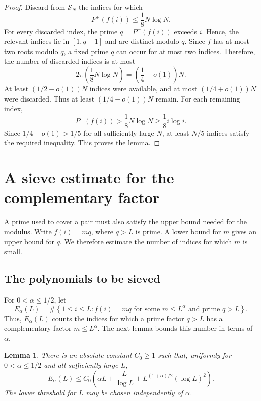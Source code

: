 \documentclass[11pt]{amsart}
\newtheorem{lemma}[theorem]{Lemma}
\theoremstyle{definition}
\theoremstyle{remark}
\begin{document}
\begin{proof}
Discard from $\mathcal S_N$ the indices for which
\[
P^+(f(i))\leq\frac18N\log N.
\]
For every discarded index, the prime $q=P^+(f(i))$ exceeds $i$.  Hence, the
relevant indices lie in $[1,q-1]$ and are distinct modulo $q$.  Since $f$
has at most two roots modulo $q$, a fixed prime $q$ can occur for at most two
indices.  Therefore,
the number of discarded indices is at most
\[
2\pi\left(\frac18N\log N\right)
=\left(\frac14+o(1)\right)N.
\]
At least $(1/2-o(1))N$ indices were available, and at most
$(1/4+o(1))N$ were discarded. Thus at least $(1/4-o(1))N$ remain. For
each remaining index,
\[
P^+(f(i))>\frac18N\log N\geq\frac18i\log i.
\]
Since $1/4-o(1)>1/5$ for all sufficiently large $N$, at least $N/5$ indices
satisfy the required inequality.  This proves the lemma.
\end{proof}

\section{A sieve estimate for the complementary factor}\label{sec:sieve}

A prime used to cover a pair must also satisfy the upper bound needed
for the modulus. Write $f(i)=mq$, where $q>L$ is prime. A lower bound
for $m$ gives an upper bound for $q$. We therefore estimate the number
of indices for which $m$ is small.

\subsection{The polynomials to be sieved}

For $0<\alpha\leq1/2$, let
\[
E_\alpha(L)
=
\#\left\{1\leq i\leq L:
 f(i)=mq\text{ for some }m\leq L^\alpha
 \text{ and prime }q>L
\right\}.
\]
Thus, $E_\alpha(L)$ counts the indices for which a prime factor $q>L$ has a
complementary factor $m\leq L^\alpha$. The next lemma bounds this number
in terms of $\alpha$.

\begin{lemma}\label{lem:smallcofactor}
There is an absolute constant $C_0\geq1$ such that, uniformly for $0<\alpha\leq1/2$ and all sufficiently large $L$,
\[
E_\alpha(L)
\leq
C_0\left(
\alpha L+\frac{L}{\log L}
+L^{(1+\alpha)/2}(\log L)^2
\right).
\]
The lower threshold for $L$ may be chosen independently of $\alpha$.
\end{lemma}
\end{document}
